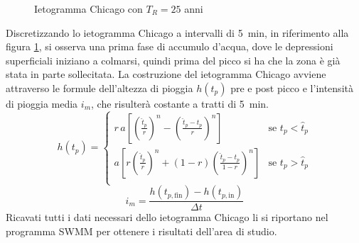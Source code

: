 \begin{figure}[htb]
    \centering
    \caption{Ietogramma Chicago con $T_R = 25$ anni}
    \label{fig:Chicago}
\end{figure}   

Discretizzando lo ietogramma Chicago a intervalli di \SI{5}{\minute}, in riferimento alla figura \ref{fig:Chicago}, si osserva una prima fase di accumulo d'acqua, dove le depressioni superficiali iniziano a colmarsi, quindi prima del picco si ha che la zona è già stata in parte sollecitata.
La costruzione del ietogramma Chicago avviene attraverso le formule dell'altezza di pioggia $h(t_p)$ pre e post picco e l'intensità di pioggia media $i_m$, che risulterà costante a tratti di \SI{5}{\minute}.
\begin{equation}
\label{eq:altezza}
    h(t_p) = 
    \begin{cases}
        r \, a \left[ \left( \frac{\hat{t}_p}{r}\right)^n - \left( \frac{\hat{t}_p - t_p}{r}\right)^n  \right] & \text{se $t_p < \hat{t}_p$}\\
        a \left[ r \left( \frac{\hat{t}_p}{r}\right)^n + (1-r)\left( \frac{\hat{t}_p - t_p}{1 - r}\right)^n  \right] & \text{se $t_p > \hat{t}_p$}\\
    \end{cases}
\end{equation}
\begin{equation}
\label{eq:imedia}
    i_m = \frac{h(t_{p,\text{fin}}) - h(t_{p,\text{in}})}{\Delta t}
\end{equation}
Ricavati tutti i dati necessari dello ietogramma Chicago li si riportano nel programma SWMM per ottenere i risultati dell'area di studio.

